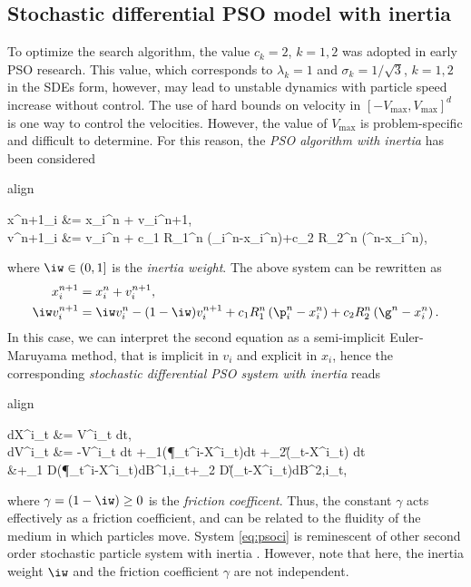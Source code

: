 \documentclass{ims9x6}
\newcommand{\coloredeq}[2]{\begin{empheq}[box={\mymath[colback=gray!13, sharp corners]}]{align}\label{#1}#2\end{empheq}}
\begin{document}
\subsection{Stochastic differential PSO model with inertia}
To optimize the search algorithm, the value $c_k= 2$, $k=1,2$ was adopted in early PSO research. This value, which corresponds to $\lambda_k=1$ and $\sigma_k=1/\sqrt{3}$, $k=1,2$ in the SDEs form, however, may lead to unstable dynamics with particle speed increase without control. The use of hard bounds on velocity in $[-V_{\max},V_{\max}]^d$ is one way to control the velocities. However, the value
of $V_{\max}$ is problem-specific and difficult to determine. For this reason, the \emph{PSO algorithm with inertia} has been  considered \cite{shieber98}
\coloredeq{eq:psoi}{
\begin{split}
x^{n+1}_i &= x_i^n + v_i^{n+1},\\
v^{n+1}_i &= \iw  v_i^n + c_1 R_1^n \left(\p_i^n-x_i^n\right)+c_2 R_2^n \left(\g^n-x_i^n\right),
\end{split}
}
where $\iw \in (0,1]$ is the \emph{inertia weight}. The above system can be rewritten as
\begin{equation}
\begin{split}
x^{n+1}_i &= x_i^n + v_i^{n+1},\\
\iw  v^{n+1}_i &= \iw  v_i^n - (1-\iw ) v_i^{n+1} + c_1 R_1^n \left(\p_i^n-x_i^n\right)+c_2 R_2^n \left(\g^n-x_i^n\right).
\end{split}
\label{eq:psoi2}
\end{equation}
In this case, we can interpret the second equation as a semi-implicit Euler-Maruyama method, that is implicit in $v_i$ and explicit in $x_i$, hence the corresponding \emph{stochastic differential PSO system with inertia} reads
\coloredeq{eq:psoci}{
\begin{split}
dX^i_t &= V^i_t dt,\\
\iw  dV^i_t &= -\gamma V^i_t dt +\lambda_1\left(\P_t^i-X^i_t\right)dt +\lambda_2\left(\G_t-X^i_t\right) dt \\
&\quad +\sigma_1 D(\P_t^i-X^i_t)dB^{1,i}_t+\sigma_2 D(\G_t-X^i_t)dB^{2,i}_t,
\end{split}} 
where $\gamma=(1-\iw ) \geq 0$ is the \emph{friction coefficent}. Thus, the constant $\gamma$ acts effectively as a friction coefficient, and can be related to the fluidity of the medium in which particles move. System \eqref{eq:psoci} is reminescent of other second order stochastic particle system with inertia \cite{AS,DLP}. However, note that here, the inertia weight $\iw $ and the friction coefficient $\gamma$ are not independent.
\end{document}

